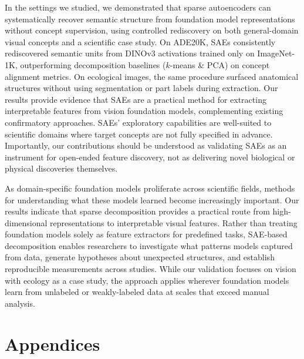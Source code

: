 \documentclass[10pt,twocolumn,letterpaper]{article}
\begin{document}
In the settings we studied, we demonstrated that sparse autoencoders can systematically recover semantic structure from foundation model representations without concept supervision, using controlled rediscovery on both general-domain visual concepts and a scientific case study.
On ADE20K, SAEs consistently rediscovered semantic units from DINOv3 activations trained only on ImageNet-1K, outperforming decomposition baselines ($k$-means \& PCA) on concept alignment metrics. 
On ecological images, the same procedure surfaced anatomical structures without using segmentation or part labels during extraction.
Our results provide evidence that SAEs are a practical method for extracting interpretable features from vision foundation models, complementing existing confirmatory approaches.
SAEs' exploratory capabilities are well-suited to scientific domains where target concepts are not fully specified in advance.
Importantly, our contributions should be understood as validating SAEs as an instrument for open-ended feature discovery, not as delivering novel biological or physical discoveries themselves.

As domain-specific foundation models proliferate across scientific fields, methods for understanding what these models learned become increasingly important. 
Our results indicate that sparse decomposition provides a practical route from high-dimensional representations to interpretable visual features. 
Rather than treating foundation models solely as feature extractors for predefined tasks, SAE-based decomposition enables researchers to investigate what patterns models captured from data, generate hypotheses about unexpected structures, and establish reproducible measurements across studies. 
While our validation focuses on vision with ecology as a case study, the approach applies wherever foundation models learn from unlabeled or weakly-labeled data at scales that exceed manual analysis.



\clearpage



\clearpage

\appendix

\setcounter{table}{0}
\renewcommand\thetable{\Alph{section}\arabic{table}}
\setcounter{figure}{0}
\renewcommand\thefigure{\Alph{section}\arabic{figure}}

\section*{Appendices}
\end{document}
